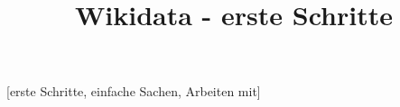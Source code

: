 \documentclass{article}
\begin{document}
\title{Wikidata - erste Schritte}

\maketitle





[erste Schritte, einfache Sachen, Arbeiten mit]
\end{document}
